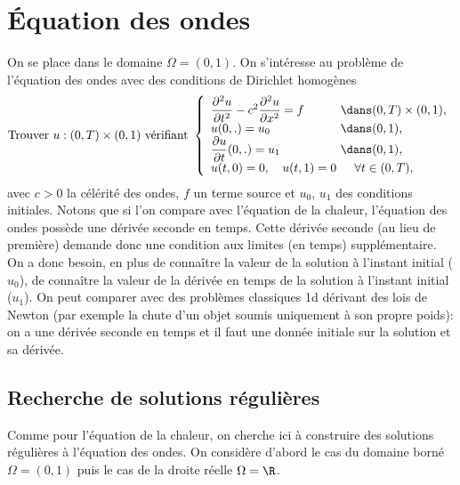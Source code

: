 \documentclass[12pt,a4paper,twoside]{article}
\begin{document}
\newpage
\section{\'Equation des ondes}

On se place dans le domaine $\Omega = (0,1)$.
On s'int\'eresse au probl\`eme de l'\'equation des ondes avec des conditions de Dirichlet homog\`enes
\begin{equation}
  \label{eq:ondes_Dir}
  \text{Trouver $u : (0,T) \times (0,1)$ v\'erifiant }
  \left\{
    \begin{array}{l l}
      \dfrac{\partial^2 u}{\partial t^2} - c^2 \dfrac{\partial^2 u}{\partial x^2} = f 
      & \!\!\!\! \dans (0,T) \times (0,1) ,
      \\
      u(0,.) = u_0 
      & \!\!\!\! \dans (0,1) ,
      \\
      \dfrac{\partial u}{\partial t}(0,.) = u_1 
      & \!\!\!\! \dans (0,1) ,
      \\
      u(t,0) = 0 , \quad u(t,1) = 0 & \;\: \forall t \in (0,T) ,
    \end{array}
  \right.
\end{equation}
avec $c>0$ la c\'el\'erit\'e des ondes, $f$ un terme source et $u_0$, $u_1$ des conditions initiales.
Notons que si l'on compare avec l'\'equation de la chaleur,
l'\'equation des ondes poss\`ede une d\'eriv\'ee seconde en temps.
Cette d\'eriv\'ee seconde (au lieu de premi\`ere) demande donc une
condition aux limites (en temps) suppl\'ementaire.
On a donc besoin, en plus de conna\^itre la valeur de la solution \`a l'instant initial ($u_0$),
de conna\^itre la valeur de la d\'eriv\'ee en temps de la solution \`a l'instant initial ($u_1$).
On peut comparer avec des probl\`emes classiques 1d d\'erivant des lois de Newton
(par exemple la chute d'un objet soumis uniquement \`a son propre poids):
on a une d\'eriv\'ee seconde en temps et il faut une donn\'ee initiale sur la solution
et sa d\'eriv\'ee.


\subsection{Recherche de solutions r\'eguli\`eres}

Comme pour l'\'equation de la chaleur, on cherche ici \`a construire des solutions
r\'eguli\`eres \`a l'\'equation des ondes.
On consid\`ere d'abord le cas du domaine born\'e $\Omega = (0,1)$
puis le cas de la droite r\'eelle $\Omega = \R$.
\end{document}
